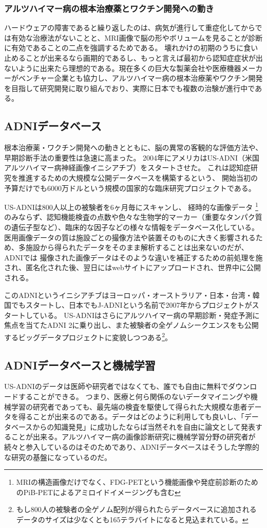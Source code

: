 \subsubsection{アルツハイマー病の根本治療薬とワクチン開発への動き}
ハードウェアの障害であると繰り返したのは、病気が進行して重症化してからでは有効な治療法がないことと、MRI画像で脳の形やボリュームを見ることが診断に有効であることの二点を強調するためである。
壊れかけの初期のうちに食い止めることが出来るなら画期的であるし、もっと言えば最初から認知症症状が出ないように出来たら理想的である。現在多くの巨大な製薬会社や医療機器メーカーがベンチャー企業とも協力し、アルツハイマー病の根本治療薬やワクチン開発を目指して研究開発に取り組んでおり、実際に日本でも複数の治験が進行中である。

\subsection{ADNIデータベース}
根本治療薬・ワクチン開発への動きとともに、脳の異常の客観的な評価方法や、早期診断手法の重要性は急速に高まった。
2004年にアメリカはUS-ADNI（米国アルツハイマー病神経画像イニシアチブ）をスタートさせた。
これは認知症研究を推進するための大規模な公開データベースを構築するという、
開始当初の予算だけでも6000万ドルという規模の国家的な臨床研究プロジェクトである。

US-ADNIは800人以上の被験者を6ヶ月毎にスキャンし、
経時的な画像データ
\footnote{
MRIの構造画像だけでなく、FDG-PETという機能画像や発症前診断のためのPiB-PETによるアミロイドイメージングも含む}のみならず、認知機能検査の点数や色々な生物学的マーカー（重要なタンパク質の遺伝子型など）、臨床的な因子などの様々な情報をデータベース化している。
医用画像データの質は施設ごとの撮像方法や装置そのものに大きく影響されるため、多施設から得られたデータをそのまま解析することは出来ないのだが、ADNIでは
撮像された画像データはそのような違いを補正するための前処理を施され、匿名化された後、翌日にはwebサイトにアップロードされ、世界中に公開される。

このADNIというイニシアチブはヨーロッパ・オーストラリア・日本・台湾・韓国でもスタートし、日本でもJ-ADNIという名前で2007年からプロジェクトがスタートしている。
US-ADNIはさらにアルツハイマー病の早期診断・発症予測に焦点を当てたADNI 2に乗り出し、また被験者の全ゲノムシークエンスをも公開するビッグデータプロジェクトに変貌しつつある\footnote{もし800人の被験者の全ゲノム配列が得られたらデータベースに追加されるデータのサイズは少なくとも165テラバイトになると見込まれている。}。

\subsection{ADNIデータベースと機械学習}
US-ADNIのデータは医師や研究者ではなくても、誰でも自由に無料でダウンロードすることができる。
つまり、医療と何ら関係のないデータマイニングや機械学習の研究者であっても、最先端の検査を駆使して得られた大規模な患者データを得ることが出来るのである。データはどのように利用しても良いし、「データベースからの知識発見」に成功したならば当然それを自由に論文として発表することが出来る。アルツハイマー病の画像診断研究に機械学習分野の研究者が続々と参入しているのはそのためであり、ADNIデータベースはそうした学際的な研究の基盤になっているのだ。

